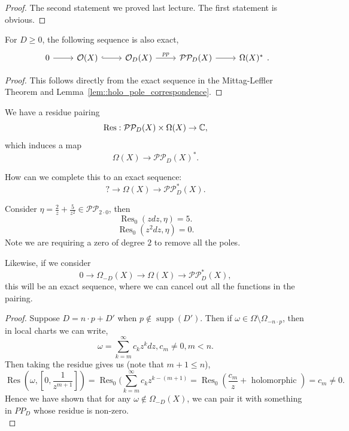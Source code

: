 \documentclass{article}
\begin{document}
{\begin{proof}
    The second statement we proved last lecture. The first statement is obvious.
\end{proof}

\begin{proposition}
For $D \geq 0$, the following sequence is also exact,
\[\begin{tikzcd}
	0 & {\mathcal{O}(X)} & {\mathcal{O}_D(X)} & {\mathcal{P}\mathcal{P}_D(X)} & {\Omega(X)^*}
	\arrow["pp", from=1-3, to=1-4]
	\arrow[from=1-1, to=1-2]
	\arrow[hook, from=1-2, to=1-3]
	\arrow[from=1-4, to=1-5]
\end{tikzcd}.\]
\end{proposition}

\begin{proof}
    This follows directly from the exact sequence in the Mittag-Leffler Theorem and Lemma~\ref{lem::holo_pole_correspondence}.
\end{proof}

We have a residue pairing
\[\operatorname{Res}: \mathcal{P} \mathcal{P}_D(X) \times \Omega(X) \to \mathbb{C},\]
which induces a map
\[\Omega(X) \to \mathcal{P}\mathcal{P}_D(X)^*.\]

\begin{question}
    How can we complete this to an exact sequence:
    \[? \to \Omega(X) \to \mathcal{P} \mathcal{P}^*_D(X).\]
\end{question}

\begin{example}
    Consider $\eta = \frac{2}{z} + \frac{5}{z^2} \in \mathcal{PP}_{2 \cdot 0}$, then
    \[\operatorname{Res}_0(z dz, \eta) = 5.\]
    \[\operatorname{Res}_0(z^2 dz, \eta) = 0.\]
    Note we are requiring a zero of degree $2$ to remove all the poles.
\end{example}

\begin{proposition}
    Likewise, if we consider
    \[0 \to \Omega_{-D}(X) \to \Omega(X) \to \mathcal{P} \mathcal{P}^*_D(X),\]
    this will be an exact sequence, where we can cancel out all the functions in the pairing.
\end{proposition}

\begin{proof}
    Suppose $D = n \cdot p + D'$ when $p \notin \operatorname{supp}(D')$. Then if $\omega \in \Omega \setminus \Omega_{-n \cdot p}$, then in local charts we can write,
    \[\omega = \sum_{k = m}^\infty c_k z^k dz, c_m \neq 0, m < n.\]
    Then taking the residue gives us (note that $m+1 \leq n$), 
    \[\operatorname{Res}(\omega, [0, \frac{1}{z^{m+1}}]) = \operatorname{Res}_0(\sum_{k = m}^{\infty} c_k z^{k-(m+1)} = \operatorname{Res}_0 (\frac{c_m}{z} + \text{ holomorphic }) = c_m \neq 0. \]
    Hence we have shown that for any $\omega \notin \Omega_{-D}(X)$, we can pair it with something in $PP_D$ whose residue is non-zero.\\


\end{proof}}
\end{document}
